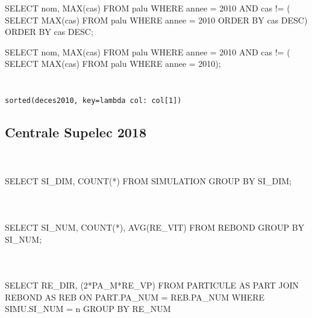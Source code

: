 \documentclass[10pt,fleqn]{article} %
\begin{document}
\begin{multicols}{2}
\begin{sql}
SELECT nom, MAX(cas)
	FROM palu
	WHERE annee = 2010 AND cas != (
			SELECT MAX(cas)
			FROM palu
			WHERE annee = 2010
			ORDER BY cas DESC)
	ORDER BY cas DESC;
\end{sql}

\begin{sql}
SELECT nom, MAX(cas)
	FROM palu
	WHERE annee = 2010 AND cas != (
			SELECT MAX(cas)
			FROM palu
			WHERE annee = 2010);
\end{sql}


\subparagraph{}~\\

\texttt{sorted(deces2010, key=lambda col: col[1])}


\subsection*{Centrale Supelec 2018}
\setcounter{exo}{0}
\subparagraph{}~\\
\begin{sql}
SELECT SI_DIM, COUNT(*)
	FROM SIMULATION
	GROUP BY SI_DIM;
\end{sql}

\subparagraph{}~\\
\begin{sql}
SELECT SI_NUM, COUNT(*), AVG(RE_VIT)
	FROM REBOND
	GROUP BY SI_NUM;
\end{sql}


\subparagraph{}~\\

\begin{sql}
SELECT  RE_DIR,  (2*PA_M*RE_VP)
	FROM PARTICULE AS PART
	JOIN REBOND AS REB
	ON PART.PA_NUM =  REB.PA_NUM
	WHERE SIMU.SI_NUM = n
	GROUP BY RE_NUM
\end{sql}







\end{multicols}
\end{document}
